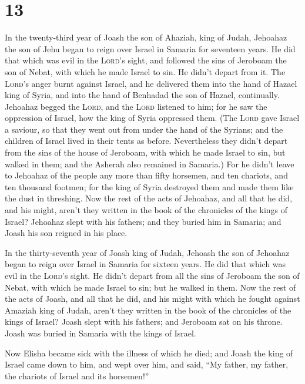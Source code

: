 \hypertarget{section-12}{%
\section{13}\label{section-12}}

 In the twenty-third year of Joash the son of Ahaziah,
king of Judah, Jehoahaz the son of Jehu began to reign over Israel in
Samaria for seventeen years.  He did that which was evil
in the \textsc{Lord}'s sight, and followed the sins of Jeroboam the son
of Nebat, with which he made Israel to sin. He didn't depart from it.
 The \textsc{Lord}'s anger burnt against Israel, and he
delivered them into the hand of Hazael king of Syria, and into the hand
of Benhadad the son of Hazael, continually.  Jehoahaz
begged the \textsc{Lord}, and the \textsc{Lord} listened to him; for he
saw the oppression of Israel, how the king of Syria oppressed them.
 (The \textsc{Lord} gave Israel a saviour, so that they
went out from under the hand of the Syrians; and the children of Israel
lived in their tents as before.  Nevertheless they didn't
depart from the sins of the house of Jeroboam, with which he made Israel
to sin, but walked in them; and the Asherah also remained in Samaria.)
 For he didn't leave to Jehoahaz of the people any more
than fifty horsemen, and ten chariots, and ten thousand footmen; for the
king of Syria destroyed them and made them like the dust in threshing.
 Now the rest of the acts of Jehoahaz, and all that he
did, and his might, aren't they written in the book of the chronicles of
the kings of Israel?  Jehoahaz slept with his fathers; and
they buried him in Samaria; and Joash his son reigned in his place.

 In the thirty-seventh year of Joash king of Judah,
Jehoash the son of Jehoahaz began to reign over Israel in Samaria for
sixteen years.  He did that which was evil in the
\textsc{Lord}'s sight. He didn't depart from all the sins of Jeroboam
the son of Nebat, with which he made Israel to sin; but he walked in
them.  Now the rest of the acts of Joash, and all that he
did, and his might with which he fought against Amaziah king of Judah,
aren't they written in the book of the chronicles of the kings of
Israel?  Joash slept with his fathers; and Jeroboam sat
on his throne. Joash was buried in Samaria with the kings of Israel.

 Now Elisha became sick with the illness of which he
died; and Joash the king of Israel came down to him, and wept over him,
and said, ``My father, my father, the chariots of Israel and its
horsemen!''

